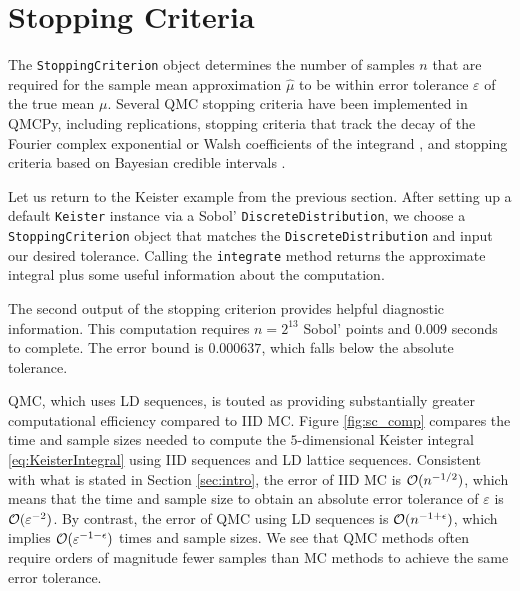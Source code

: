 \documentclass[graybox,footinfo]{svmult}
\newcommand{\hmu}{\widehat{\mu}}
\begin{document}
\section{Stopping Criteria} \label{sec:stopping_crit}

The \texttt{StoppingCriterion} object determines the number of samples $n$ that are required for the sample mean approximation $\hmu$ to be within error tolerance $\varepsilon$ of the true mean $\mu$.  Several QMC stopping criteria have been implemented in QMCPy, including replications, stopping criteria that track the decay of the Fourier complex exponential or Walsh coefficients of the integrand \cite{HicJim16a,HicEtal17a,JimHic16a}, and stopping criteria based on Bayesian credible intervals \cite{RatHic19a,JagHic22a}.

Let us return to the Keister example from the previous section.  After setting up  a default \texttt{Keister} instance via a Sobol' \texttt{DiscreteDistribution}, we choose a \texttt{StoppingCriterion} object that matches the \texttt{DiscreteDistribution} and input our desired tolerance.  Calling the  \texttt{integrate} method returns the approximate integral plus some useful information about the computation.

The second output of the stopping criterion provides helpful diagnostic information.  This computation requires $n=2^{13}$ Sobol' points and $0.009$ seconds to complete.  The error bound is $0.000637$, which falls below the absolute tolerance.

QMC, which uses LD sequences, is touted as providing substantially greater computational efficiency compared to IID MC.
Figure \ref{fig:sc_comp} compares the time and sample sizes needed to compute the $5$-dimensional Keister integral \eqref{eq:KeisterIntegral} using IID sequences and LD lattice sequences. Consistent with what is stated in Section \ref{sec:intro}, the error of IID MC is ${\mathcal{O}}(n^{-1/2})$, which means that the time and sample size to obtain an absolute error tolerance of $\varepsilon$ is ${\mathcal{O}}(\varepsilon^{-2})$.  By contrast, the  error of QMC using LD sequences is ${\mathcal{O}}(n^{-1+\epsilon})$, which implies ${\mathcal{O}}(\varepsilon^{-1-\epsilon})$ times and sample sizes.  We see that QMC methods often require orders of magnitude fewer samples than MC methods to achieve the same error tolerance.
\end{document}
